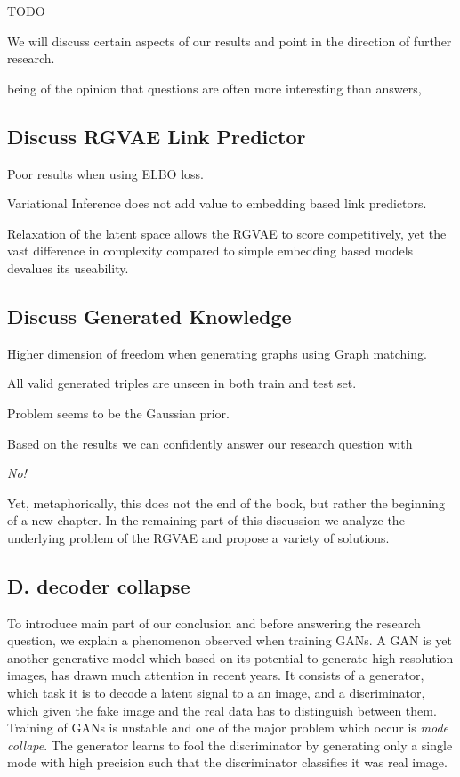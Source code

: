 
TODO

We will discuss certain aspects of our results and point in the direction of further research.

being of the opinion that questions are often more interesting than answers,

\subsection{Discuss RGVAE Link Predictor}


Poor results when using ELBO loss.

Variational Inference does not add value to embedding based link predictors.

Relaxation of the latent space allows the RGVAE to score competitively, yet the vast difference in complexity compared to simple embedding based models devalues its useability. 

\subsection{Discuss Generated Knowledge}

Higher dimension of freedom when generating graphs using Graph matching.

All valid generated triples are unseen in both train and test set. 

Problem seems to be the Gaussian prior.

Based on the results we can confidently answer our research question with 
\begin{center}
    \textit{No!}
\end{center}
Yet, metaphorically, this does not the end of the book, but rather the beginning of a new chapter. In the remaining part of this discussion we analyze the underlying problem of the RGVAE and propose a variety of solutions.


\subsection{D. decoder collapse}
\label{ssec7:collapse}

To introduce main part of our conclusion and before answering the research question, we explain a phenomenon observed when training GANs. A GAN is yet another generative model which based on its potential to generate high resolution images, has drawn much attention in recent years. It consists of a generator, which task it is to decode a latent signal to a an image, and a discriminator, which given the fake image and the real data has to distinguish between them. Training of GANs is unstable and one of the major problem which occur is \textit{mode collape}. The generator learns to fool the discriminator by generating only a single mode with high precision such that the discriminator classifies it was real image.

